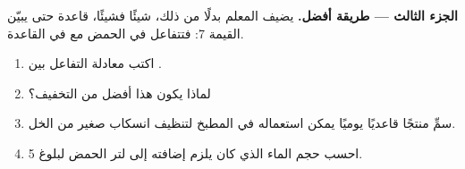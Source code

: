 \begin{problem}
\medskip
\noindent\textbf{الجزء الثالث --- طريقة أفضل.}
يضيف المعلم بدلًا من ذلك، شيئًا فشيئًا،  قاعدة حتى يبيّن  القيمة
7: فتتفاعل   في الحمض مع  
في القاعدة.
\begin{enumerate}[resume]
  \item اكتب معادلة التفاعل بين   
        .
  \item لماذا يكون هذا أفضل من التخفيف؟
  \item سمِّ منتجًا قاعديًا يوميًا يمكن استعماله في المطبخ لتنظيف انسكاب صغير
        من الخل.
  \item احسب حجم الماء الذي كان يلزم إضافته إلى لتر الحمض لبلوغ
         5.
\end{enumerate}
\end{problem}
